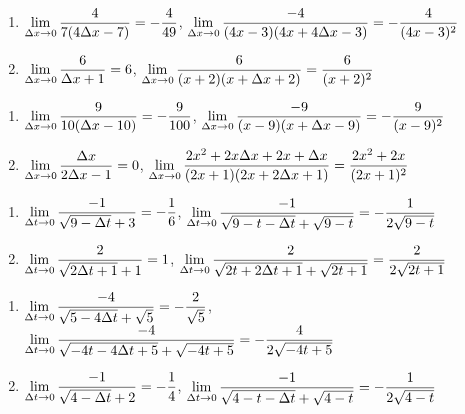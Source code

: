 \begin{enumerate}
\setcounter{enumi}{\value{HW}}

\item  $\displaystyle{ \lim_{\Delta x \rightarrow 0} \dfrac{4}{7(4 \Delta x - 7)} = - \dfrac{4}{49}}$,   $\displaystyle{ \lim_{\Delta x \rightarrow 0} \dfrac{-4}{(4x-3)(4x+4\Delta x-3)} =  - \dfrac{4}{(4x-3)^2}}$     
\item $\displaystyle{ \lim_{\Delta x \rightarrow 0} \dfrac{6}{\Delta x + 1}= 6}$,   $\displaystyle{ \lim_{\Delta x \rightarrow 0} \dfrac{6}{(x+2)(x+\Delta x+2)} =   \dfrac{6}{(x+2)^2}}$      
 
\setcounter{HW}{\value{enumi}}
\end{enumerate}

\begin{enumerate}
\setcounter{enumi}{\value{HW}}

\item   $\displaystyle{ \lim_{\Delta x \rightarrow 0} \dfrac{9}{10(\Delta x - 10)} = -\dfrac{9}{100}}$,   $\displaystyle{ \lim_{\Delta x \rightarrow 0} \dfrac{-9}{(x - 9)(x + \Delta x - 9)} =   -\dfrac{9}{(x-9)^2}}$  
\item $\displaystyle{ \lim_{\Delta x \rightarrow 0} \dfrac{\Delta x}{2 \Delta x - 1} = 0}$,   $\displaystyle{ \lim_{\Delta x \rightarrow 0}\dfrac{2x^2+2x\Delta x+2x+\Delta x}{(2x+1)(2x+2\Delta x+1)}=  \dfrac{2x^2+2x}{(2x+1)^2}}$  


\setcounter{HW}{\value{enumi}}
\end{enumerate}

\begin{enumerate}
\setcounter{enumi}{\value{HW}}

\item  $\displaystyle{ \lim_{\Delta t \rightarrow 0}\dfrac{-1}{\sqrt{9-\Delta t} +3}  = -\dfrac{1}{6}}$,   $\displaystyle{ \lim_{\Delta t \rightarrow 0} \dfrac{-1}{\sqrt{9-t-\Delta t} + \sqrt{9-t}}=   -\dfrac{1}{2 \sqrt{9-t}}}$   
\item  $\displaystyle{ \lim_{\Delta t \rightarrow 0}\dfrac{2}{\sqrt{2\Delta t+1} + 1}  =1}$,   $\displaystyle{ \lim_{\Delta t \rightarrow 0}\dfrac{2}{\sqrt{2t+2\Delta t+1} + \sqrt{2t+1}}=   \dfrac{2}{2 \sqrt{2t+1}}}$    

\setcounter{HW}{\value{enumi}}
\end{enumerate}

\begin{enumerate}
\setcounter{enumi}{\value{HW}}

\item $\displaystyle{ \lim_{\Delta t \rightarrow 0} \dfrac{-4}{\sqrt{5-4\Delta t} + \sqrt{5}}  = - \dfrac{2}{\sqrt{5}}}$,   $\displaystyle{ \lim_{\Delta t \rightarrow 0} \dfrac{-4}{\sqrt{-4t-4\Delta t+5} + \sqrt{-4t+5}} =   -\dfrac{4}{2 \sqrt{-4t+5}}}$ 
\item  $\displaystyle{ \lim_{\Delta t \rightarrow 0} \dfrac{-1}{\sqrt{4-\Delta t} + 2}  = - \dfrac{1}{4}}$,   $\displaystyle{ \lim_{\Delta t \rightarrow 0} \dfrac{-1}{\sqrt{4-t-\Delta t} + \sqrt{4-t}} = -\dfrac{1}{2 \sqrt{4-t}} }$  

\setcounter{HW}{\value{enumi}}
\end{enumerate}

